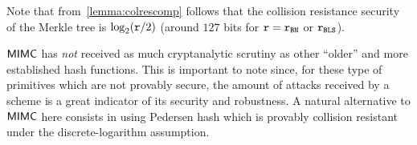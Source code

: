 \begin{remark}
    Note that from~\cref{lemma:colrescomp} follows that the collision resistance security of the \zeth{} Merkle tree is $\log_2(\mathtt{r}/2)$ (around $127$ bits for $\mathtt{r} = \mathtt{r_{BN}}$ or $\mathtt{r_{BLS}}$).
\end{remark}

\begin{notebox}
    $\mathsf{MIMC{}}$ has \emph{not} received as much cryptanalytic scrutiny as other ``older'' and more established hash functions. This is important to note since, for these type of primitives which are not provably secure, the amount of attacks received by a scheme is a great indicator of its security and robustness.
    A natural alternative to $\mathsf{MIMC{}}$ here consists in using Pedersen hash which is provably collision resistant under the discrete-logarithm assumption.
\end{notebox}
